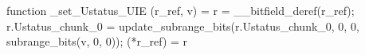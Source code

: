 function _set_Ustatus_UIE (r_ref, v) = {
    r = __bitfield_deref(r_ref);
    r.Ustatus_chunk_0 = update_subrange_bits(r.Ustatus_chunk_0, 0, 0, subrange_bits(v, 0, 0));
    (*r_ref) = r
}

